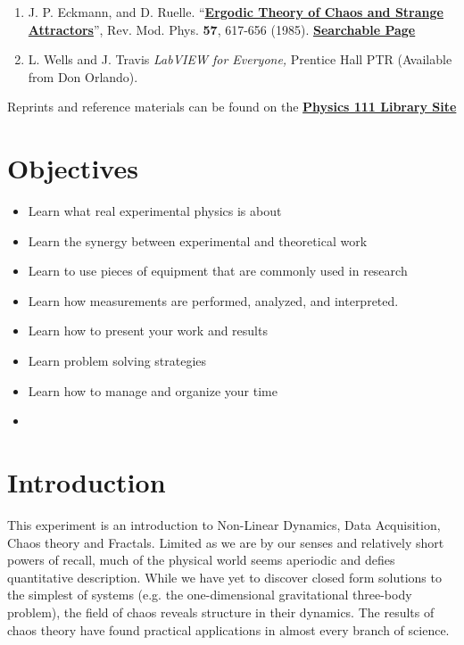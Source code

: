 \documentclass{../lab}
\begin{document}
\begin{enumerate}
    \item J. P. Eckmann, and D. Ruelle. ``\href{http://rmp.aps.org/abstract/RMP/v57/i3/p617\_1}{\textbf{Ergodic Theory of Chaos and Strange Attractors}}'', Rev. Mod. Phys. \textbf{57}, 617-656 (1985). \href{http://physics111.lib.berkeley.edu/Physics111/Reprints/NLD/17-Ergodic\_Theory.pdf}{\textbf{Searchable Page}}

    \item L. Wells and J. Travis \emph{LabVIEW for Everyone, }Prentice Hall PTR (Available from Don Orlando).

\end{enumerate}

Reprints and reference materials can be found on the \href{http://physics111.lib.berkeley.edu/Physics111/Reprints/NLD/NLD\_index.html}{\textbf{Physics 111 Library Site}}

\section{Objectives}

\begin{itemize}
    \item Learn what real experimental physics is about

    \item Learn the synergy between experimental and theoretical work

    \item Learn to use pieces of equipment that are commonly used in research

    \item Learn how measurements are performed, analyzed, and interpreted.

    \item Learn how to present your work and results

    \item Learn problem solving strategies

    \item Learn how to manage and organize your time

    \item 

\end{itemize}

\section{Introduction}

This experiment is an introduction to Non-Linear Dynamics, Data Acquisition, Chaos theory and Fractals. Limited as we are by our senses and relatively short powers of recall, much of the physical world seems aperiodic and defies quantitative description. While we have yet to discover closed form solutions to the simplest of systems (e.g. the one-dimensional gravitational three-body problem), the field of chaos reveals structure in their dynamics. The results of chaos theory have found practical applications in almost every branch of science.
\end{document}
